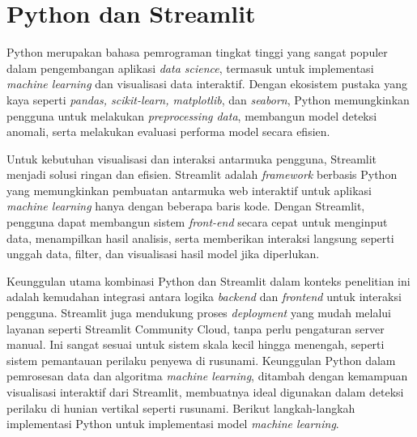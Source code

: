 
\section{Python dan Streamlit}\label{sec:python_streamlit}

{Python} merupakan bahasa pemrograman tingkat tinggi yang sangat populer dalam pengembangan aplikasi {\it data science}, termasuk untuk implementasi {\it machine learning} dan visualisasi data interaktif. Dengan ekosistem pustaka yang kaya seperti {\it pandas, scikit-learn, matplotlib}, dan {\it seaborn}, {Python} memungkinkan pengguna untuk melakukan {\it preprocessing data}, membangun model deteksi anomali, serta melakukan evaluasi performa model secara efisien.

    Untuk kebutuhan visualisasi dan interaksi antarmuka pengguna, Streamlit menjadi solusi ringan dan efisien. Streamlit adalah {\it framework} berbasis {Python} yang memungkinkan pembuatan antarmuka web interaktif untuk aplikasi {\it machine learning} hanya dengan beberapa baris kode. Dengan Streamlit, pengguna dapat membangun sistem {\it front-end} secara cepat untuk menginput data, menampilkan hasil analisis, serta memberikan interaksi langsung seperti unggah data, filter, dan visualisasi hasil model jika diperlukan.
    
    Keunggulan utama kombinasi {Python} dan Streamlit dalam konteks penelitian ini adalah kemudahan integrasi antara logika {\it backend} dan {\it frontend} untuk interaksi pengguna. Streamlit juga mendukung proses {\it deployment} yang mudah melalui layanan seperti Streamlit Community Cloud, tanpa perlu pengaturan server manual. Ini sangat sesuai untuk sistem skala kecil hingga menengah, seperti sistem pemantauan perilaku penyewa di rusunami. Keunggulan {Python} dalam pemrosesan data dan algoritma {\it machine learning}, ditambah dengan kemampuan visualisasi interaktif dari Streamlit, membuatnya ideal digunakan dalam deteksi perilaku di hunian vertikal seperti rusunami. Berikut langkah-langkah implementasi {Python} untuk implementasi model {\it machine learning}.
    
